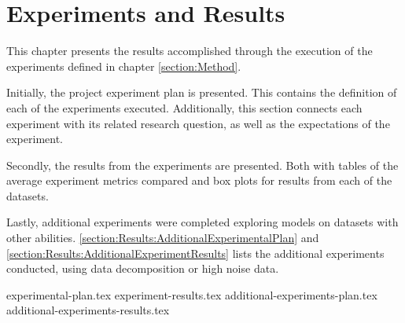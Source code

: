 \chapter{Experiments and Results}
\label{section:Results}

This chapter presents the results accomplished through the execution of the experiments defined in chapter \cref{section:Method}.

Initially, the project experiment plan is presented.
This contains the definition of each of the experiments executed.
Additionally, this section connects each experiment with its related research question,
as well as the expectations of the experiment.

Secondly, the results from the experiments are presented.
Both with tables of the average experiment metrics compared and box plots for results from each of the datasets.

Lastly, additional experiments were completed exploring models on datasets with other abilities.
\cref{section:Results:AdditionalExperimentalPlan} and \cref{section:Results:AdditionalExperimentResults}
lists the additional experiments conducted, using data decomposition or high noise data.


{experimental-plan.tex}
{experiment-results.tex}
{additional-experiments-plan.tex}
{additional-experiments-results.tex}




\iffalse

  \section{Experimental Setup}
  \label{sec:experimentalSetup}

  The experimental setup should include all data - parameters etc, that would allow a person to repeat your experiments.

  \section{Experimental Results}
  \label{sec:experimentalResults}

  Results should be clearly displayed and should provide a suitable representation of your results for the points you wish to make. Graphs should be labeled in a legible font and if more than one result is displayed on the same graph then these should be clearly marked.   Please choose carefully rather than presenting every results. Too much information is hard to read and often hides the key information you wish to present. Make use of statistical methods when presenting results, where possible to strengthen the results.  Further, the format of the presentation of results should be chosen based on what issues in the results you wish to highlight. You may wish to present a subset in the experimental section and provide additional results in the appendix.
\fi